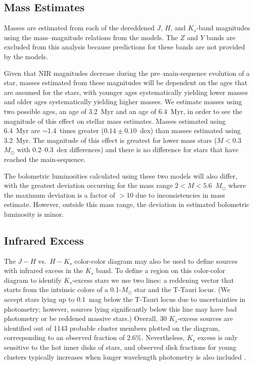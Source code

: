 \documentclass[twocolumn,tighten]{aastex61}
\begin{document}
\vspace{-2mm}
\subsection{Mass Estimates}

Masses are estimated from each of the dereddened $J$, $H$, and $K_s$-band magnitudes using the mass--magnitude relations from the \citeauthor{2000A&A...358..593S} models. The $Z$ and $Y$ bands are excluded from this analysis because predictions for these bands are not provided by the models.

Given that NIR magnitudes decrease during the pre--main-sequence evolution of a star, masses estimated from these magnitudes will be dependent on the ages that are assumed for the stars, with younger ages systematically yielding lower masses and older ages systematically yielding higher masses. We estimate masses using two possible ages, an age of 3.2~Myr and an age of 6.4~Myr, in order to see the magnitude of this effect on stellar mass estimates. Masses estimated using 6.4~Myr are $\sim$1.4~times greater ($0.14\pm0.10$~dex) than masses estimated using 3.2~Myr. The magnitude of this effect is greatest for lower mass stars ($M<0.3$~$M_\odot$ with 0.2--0.3~dex differences) and there is no difference for stars that have reached the main-sequence. 

The bolometric luminosities calculated using these two models will also differ, with the greatest deviation occurring for the mass range $2<M<5.6$~$M_\odot$ where the maximum deviation is a factor of $>$10 due to inconsistencies in mass estimate. However, outside this mass range, the deviation in estimated bolometric luminosity is minor.

\subsection{Infrared Excess}

The $J-H$ vs.\ $H-K_s$ color-color diagram may also be used to define sources with infrared excess in the $K_s$ band. To define a region on this color-color diagram to identify $K_s$-excess stars we use two lines: a reddening vector that starts from the intrinsic colors of a 0.1-$M_\odot$ star and the T-Tauri locus. (We accept stars lying up to 0.1~mag below the T-Tauri locus due to uncertainties in photometry; however, sources lying significantly below this line may have bad photometry or be reddened massive stars.) Overall, 30 $K_s$-excess sources are identified out of 1143 probable cluster members plotted on the diagram, corresponding to an observed fraction of 2.6\%. Nevertheless, $K_s$ excess is only sensitive to the hot inner disks of stars, and observed disk fractions for young clusters typically increases when longer wavelength photometry is also included \citep[e.g.][]{2001ApJ...553L.153H}.
\end{document}
